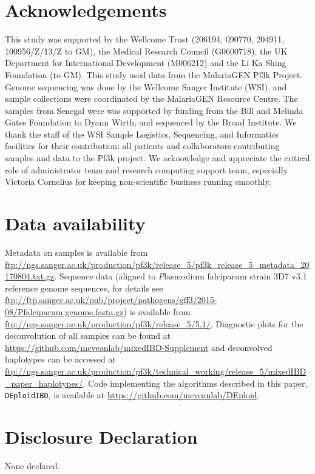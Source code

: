 \documentclass[9pt,lineno]{elife}
\begin{document}
\section{Acknowledgements}
This study was supported by the Wellcome Trust (206194, 090770, 204911, 100956/Z/13/Z to GM), the Medical Research Council (G0600718), the UK Department for International Development (M006212) and the Li Ka Shing Foundation (to GM). This study used data from the MalariaGEN Pf3k Project. Genome sequencing was done by the Wellcome Sanger Institute (WSI), and sample collections were coordinated by the MalariaGEN Resource Centre. The samples from Senegal were was supported by funding from the Bill and Melinda Gates Foundation to Dyann Wirth, and sequenced by the Broad Institute. We thank the staff of the WSI Sample Logistics, Sequencing, and Informatics facilities for their contribution; all patients and collaborators contributing samples and data to the Pf3k project. We acknowledge and appreciate the critical role of administrator team and research computing support team, especially Victoria Cornelius for keeping non-scientific business running smoothly.


\section{Data availability}
Metadata on samples is available from \url{ftp://ngs.sanger.ac.uk/production/pf3k/release_5/pf3k_release_5_metadata_20170804.txt.gz}.  Sequence data (aligned to {\emph Plasmodium falciparum} strain 3D7 v3.1 reference genome sequences, for details see \url{      ftp://ftp.sanger.ac.uk/pub/project/pathogens/gff3/2015-08/Pfalciparum.genome.fasta.gz}) is available from  \url{ftp://ngs.sanger.ac.uk/production/pf3k/release_5/5.1/}.  Diagnostic plots for the deconvolution of all samples can be found at \url{https://github.com/mcveanlab/mixedIBD-Supplement} and deconvolved haplotypes can be accessed at \url{ftp://ngs.sanger.ac.uk/production/pf3k/technical_working/release_5/mixedIBD_paper_haplotypes/}.  Code implementing the algorithms described in this paper, \texttt{DEploidIBD}, is available at \url{https://github.com/mcveanlab/DEploid}.


\section{Disclosure Declaration}
None declared.



\end{document}
